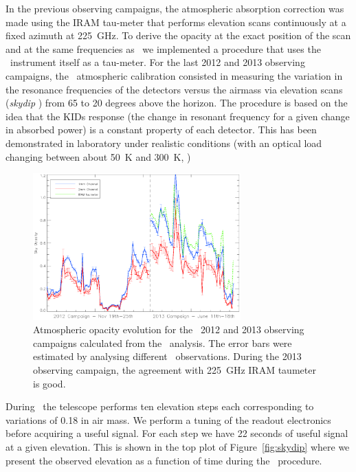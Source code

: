 In the previous observing campaigns, the atmospheric absorption correction
was made using the IRAM tau-meter that performs elevation scans continuously
at a fixed azimuth at 225~GHz. To derive the opacity at the exact position of
the scan and at the same frequencies as \NIKA\, we implemented a
procedure that uses the \NIKA\ instrument itself as a tau-meter. For the
last 2012 and 2013 observing campaigns, the \NIKA\ atmospheric calibration
consisted in measuring the variation in the resonance frequencies of the
detectors versus the airmass via elevation scans (\emph{skydip} \cite{dicke})
from 65 to 20 degrees above the horizon. The procedure is based 
on the idea that the KIDs response (the change in resonant frequency for a given 
change in absorbed power) is a constant property of each detector. This has been
demonstrated in laboratory under realistic conditions (with an optical load changing 
between about 50~K and 300~K, \cite{monfardiniLTD})

\begin{figure}[b!]
\begin{center}
\includegraphics[width=8cm]{figures/opa_run_all_notaumeter_v1.eps}
\end{center}
\caption{Atmospheric opacity evolution for the \NIKA\ 2012 and 2013 observing campaigns 
calculated from the \Skydip\ analysis. The error bars were estimated by
analysing different \Skydip\ observations. During the 2013 observing campaign, the agreement with 225~GHz IRAM taumeter is good.}
\label{fig:op}
\end{figure}


During \Skydip\, the telescope performs ten elevation steps each corresponding to variations of 0.18 in air
mass. We perform a tuning of the readout electronics before acquiring a useful signal. For
each step we have 22 seconds of useful signal at a given elevation. This is shown
in the top plot of  Figure~\ref{fig:skydip} where we present the observed elevation as a function
of time during the \Skydip\ procedure.

